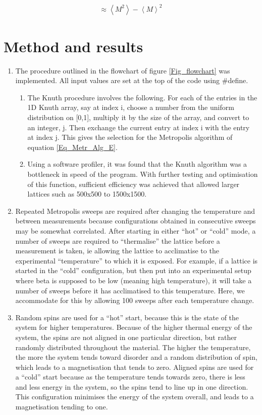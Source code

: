 \documentclass[a4paper]{article}
\begin{document}
\begin{align}
	\approx\left<M^2\right>-\left<M\right>^2
\end{align}

\clearpage
\section{Method and results}\label{Method_results}
\begin{enumerate}
	\item The procedure outlined in the flowchart of figure \ref{Fig_flowchart} was implemented. All input values are set at the top of the code using #define.
	\begin{enumerate}
		\item The Knuth procedure involves the following. For each of the entries in the 1D Knuth array, say at index i, choose a number from the uniform distribution on [0,1], multiply it by the size of the array, and convert to an integer, j. Then exchange the current entry at index i with the entry at index j. This gives the selection for the Metropolis algorithm of equation \ref{Eq_Metr_Alg_E}.
		\item Using a software profiler, it was found that the Knuth algorithm was a bottleneck in speed of the program. With further testing and optimisation of this function, sufficient efficiency was achieved that allowed larger lattices such as 500x500 to 1500x1500.
	\end{enumerate}
	\item Repeated Metropolis sweeps are required after changing the temperature and between measurements because configurations obtained in consecutive sweeps may be somewhat correlated. After starting in either ``hot'' or ``cold'' mode, a number of sweeps are required to ``thermalise'' the lattice before a measurement is taken, ie allowing the lattice to acclimatise to the experimental ``temperature'' to which it is exposed. For example, if a lattice is started in the ``cold'' configuration, but then put into an experimental setup where beta is supposed to be low (meaning high temperature), it will take a number of sweeps before it has acclimatised to this temperature. Here, we accommodate for this by allowing 100 sweeps after each temperature change.
	
	\item Random spins are used for a ``hot'' start, because this is the state of the system for higher temperatures. Because of the higher thermal energy of the system, the spins are not aligned in one particular direction, but rather randomly distributed throughout the material. The higher the temperature, the more the system tends toward disorder and a random distribution of spin, which leads to a magnetisation that tends to zero. Aligned spins are used for a ``cold'' start because as the temperature tends towards zero, there is less and less energy in the system, so the spins tend to line up in one direction. This configuration minimises the energy of the system overall, and leads to a magnetisation tending to one.
\end{enumerate}
\end{document}
